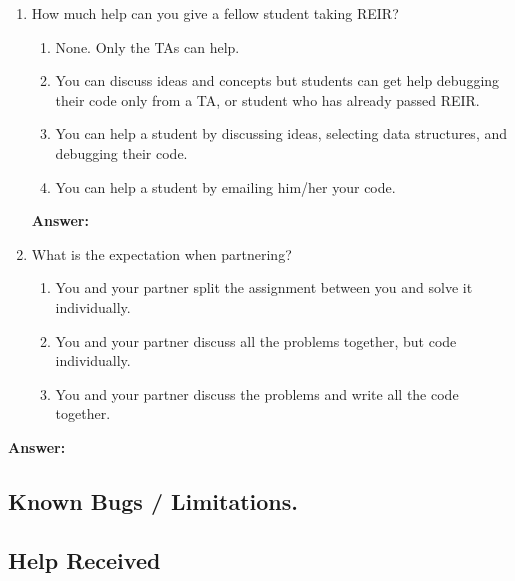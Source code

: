 \documentclass[11pt,a4paper,notitlepage]{article}
\newcommand{\explanation}[1]{}  %
\begin{document}
\begin{enumerate}
\item How much help can you give a fellow student taking REIR?
\begin{enumerate}
\item None. Only the TAs can help.
\item You can discuss ideas and concepts but students can get help
    debugging their code only from a TA, or
    student who has already passed REIR.
\item You can help a student by discussing ideas, selecting data
    structures, and debugging their code.
\item You can help a student by emailing him/her your code.
\end{enumerate}

\textbf{Answer:} 

\item What is the expectation when partnering?
\begin{enumerate}
 \item You and your partner split the assignment between you and solve it individually.
 \item You and your partner discuss all the problems together, but code individually.
 \item You and your partner discuss the problems and write all the code together.
\end{enumerate}
\end{enumerate}

\textbf{Answer:} 
 
\subsection{Known Bugs / Limitations.}

\subsection{Help Received}
\explanation{
Describe whatever help (if any) that you received.
Don't include readings, lectures, and classes, but do
include any help from people (including course staff, lab TAs,
classmates, and friends) and attribute them by name.}
\end{document}
